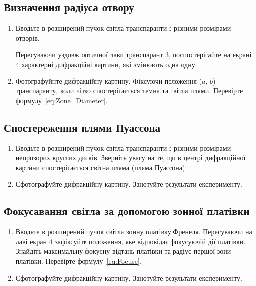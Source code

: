 \subsection{Визначення радіуса отвору}

\begin{enumerate}
\item Вводьте  в розширений пучок світла транспаранти з різними розмірами отворів.

 Пересуваючи уздовж оптичної лави транспарант $3$, поспостерігайте на екрані $4$ характерні дифракційні картини, які змінюють одна одну. 

\item   Фотографуйнте дифракційну картину. Фіксуючи положення ($a$, $b$) транспаранту, коли чітко спостерігається темна та світла плями. Перевірте формулу~\eqref{eq:Zone_Diameter}.
\end{enumerate} 

\subsection{Спостереження плями Пуассона}

\begin{enumerate}
\item Вводьте  в розширений пучок світла транспаранти з різними розмірами непрозорих круглих дисків. Зверніть увагу на те, що в центрі дифракційної картини спостерігається світна пляма (пляма Пуассона).
\item Сфотографуйте дифракційну картину. Занотуйте результати експерименту.
\end{enumerate}
\subsection{Фокусавання світла за допомогою зонної платівки}
 \begin{enumerate}
\item Вводьте  в розширений пучок світла зонну платівку Френеля. Пересуваючи на лаві екран $4$ зафіксуйте положення, яке відповідає фокусуючій дії платівки. Знайдіть максимальну фокусну відтань платівки та радіус першої зони платівки. Перевірте формулу~\eqref{eq:Focuse}.
\item Сфотографуйте дифракційну картину. Занотуйте результати експерименту. 
\end{enumerate}  

